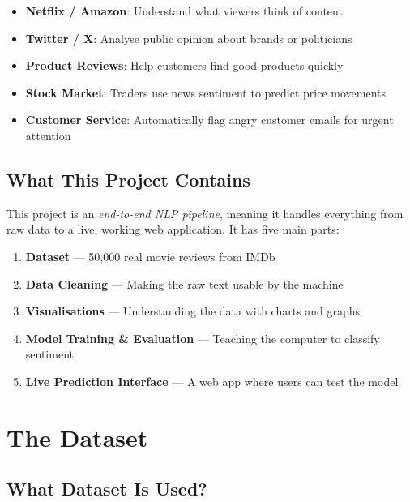 \documentclass[12pt, a4paper]{article}
\begin{document}
\begin{itemize}
  \item \textbf{Netflix / Amazon}: Understand what viewers think of content
  \item \textbf{Twitter / X}: Analyse public opinion about brands or politicians
  \item \textbf{Product Reviews}: Help customers find good products quickly
  \item \textbf{Stock Market}: Traders use news sentiment to predict price movements
  \item \textbf{Customer Service}: Automatically flag angry customer emails for urgent attention
\end{itemize}

\subsection{What This Project Contains}

This project is an \emph{end-to-end NLP pipeline}, meaning it handles everything from raw data to a live, working web application. It has five main parts:

\begin{enumerate}
  \item \textbf{Dataset} — 50{,}000 real movie reviews from IMDb
  \item \textbf{Data Cleaning} — Making the raw text usable by the machine
  \item \textbf{Visualisations} — Understanding the data with charts and graphs
  \item \textbf{Model Training \& Evaluation} — Teaching the computer to classify sentiment
  \item \textbf{Live Prediction Interface} — A web app where users can test the model
\end{enumerate}

\newpage

\section{The Dataset}

\subsection{What Dataset Is Used?}
\end{document}

